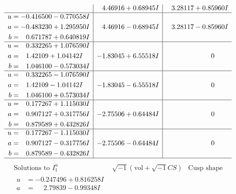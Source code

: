 \documentclass[1p]{elsarticle_modified}
\theoremstyle{definition}
\newcommand{\I}{\sqrt{-1}}
\begin{document}
$$\begin{array}{c|c|c}
 & \phantom{-}4.46916 + 0.68945 I & \phantom{-}3.28117 + 0.85960 I \\ \hline\begin{aligned}
u &= -0.416500 - 0.770558 I \\
a &= -0.483230 + 1.295950 I \\
b &= \phantom{-}0.671787 + 0.640819 I\end{aligned}
 & \phantom{-}4.46916 - 0.68945 I & \phantom{-}3.28117 - 0.85960 I \\ \hline\begin{aligned}
u &= \phantom{-}0.332265 + 1.076590 I \\
a &= \phantom{-}1.42109 + 1.04142 I \\
b &= \phantom{-}1.046100 - 0.573034 I\end{aligned}
 & -1.83045 + 6.55518 I & \phantom{-0.000000 } 0 \\ \hline\begin{aligned}
u &= \phantom{-}0.332265 - 1.076590 I \\
a &= \phantom{-}1.42109 - 1.04142 I \\
b &= \phantom{-}1.046100 + 0.573034 I\end{aligned}
 & -1.83045 - 6.55518 I & \phantom{-0.000000 } 0 \\ \hline\begin{aligned}
u &= \phantom{-}0.177267 + 1.115030 I \\
a &= \phantom{-}0.907127 + 0.317756 I \\
b &= \phantom{-}0.879589 + 0.432826 I\end{aligned}
 & -2.75506 + 0.64484 I & \phantom{-0.000000 } 0 \\ \hline\begin{aligned}
u &= \phantom{-}0.177267 - 1.115030 I \\
a &= \phantom{-}0.907127 - 0.317756 I \\
b &= \phantom{-}0.879589 - 0.432826 I\end{aligned}
 & -2.75506 - 0.64484 I & \phantom{-0.000000 } 0\\
 \hline 
 \end{array}$$\newpage$$\begin{array}{c|c|c}  
\text{Solutions to }I^u_{1}& \I (\text{vol} + \sqrt{-1}CS) & \text{Cusp shape}\\
 \hline 
\begin{aligned}
u &= -0.247496 + 0.816258 I \\
a &= \phantom{-}2.79839 - 0.99348 I \\

\end{aligned}
\end{array}$$
\end{document}
